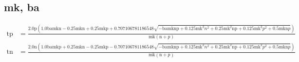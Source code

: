 \documentclass[3p,times]{elsarticle}
\begin{document}
\begin{footnotesize}
\begin{landscape}
\section{mk, ba}
\begin{align}
\mathrm{tp} &= \frac{2.0 \mathrm{p} \left(1.0 \mathrm{ba} \mathrm{mk} \mathrm{n} - 0.25 \mathrm{mk} \mathrm{n} + 0.25 \mathrm{mk} \mathrm{p} + 0.707106781186548 \sqrt{- \mathrm{ba} \mathrm{mk} \mathrm{n} \mathrm{p} + 0.125 \mathrm{mk}^{2} n^{2} + 0.25 \mathrm{mk}^{2} \mathrm{n} \mathrm{p} + 0.125 \mathrm{mk}^{2} p^{2} + 0.5 \mathrm{mk} \mathrm{n} p}\right)}{\mathrm{mk} \left(\mathrm{n} + p\right)}\\
\mathrm{tn} &= \frac{2.0 \mathrm{n} \left(1.0 \mathrm{ba} \mathrm{mk} \mathrm{p} + 0.25 \mathrm{mk} \mathrm{n} - 0.25 \mathrm{mk} \mathrm{p} - 0.707106781186548 \sqrt{- \mathrm{ba} \mathrm{mk} \mathrm{n} \mathrm{p} + 0.125 \mathrm{mk}^{2} n^{2} + 0.25 \mathrm{mk}^{2} \mathrm{n} \mathrm{p} + 0.125 \mathrm{mk}^{2} p^{2} + 0.5 \mathrm{mk} \mathrm{n} p}\right)}{\mathrm{mk} \left(\mathrm{n} + p\right)}
\end{align}

\end{landscape}
\end{footnotesize}
\end{document}

